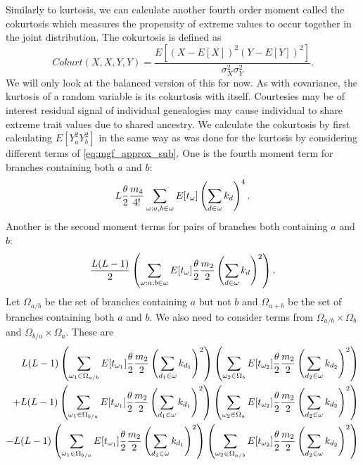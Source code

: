 Similarly to kurtosis, we can calculate another fourth order moment called the
cokurtosis which measures the propensity of extreme values to occur together in
the joint distribution. The cokurtosis is defined as
\begin{equation}
  \label{eq:cokurtosis_def}
  Cokurt(X,X,Y,Y)=\frac{E[(X-E[X])^2(Y-E[Y])^2]}{\sigma_X^2\sigma_Y^2}.
\end{equation}
We will only look at the balanced version of this for now. As with covariance,
the kurtosis of a random variable is its cokurtosis with itself. Courtesies may
be of interest residual signal of individual genealogies may cause individual to
share extreme trait values due to shared ancestry. We calculate the cokurtosis
by first calculating $E[Y_a^2Y_b^2]$ in the same way as was done for the
kurtosis by considering different terms of \eqref{eq:mgf_approx_sub}. One is the
fourth moment term for branches containing both $a$ and $b$:
\begin{equation*}
  L \frac{\theta}{2} \frac{m_4}{4!} \sum_{\omega : a, b \in \omega} E[t_\omega] \left( \sum_{d \in \omega} k_d \right)^4.
\end{equation*}
Another is the second moment terms for pairs of branches both containing $a$ and $b$:
\begin{equation*}
  \frac{L(L-1)}{2} \left( \sum_{\omega : a, b \in \omega}
  E[t_\omega] \frac{\theta}{2} \frac{m_2}{2} \left( \sum_{d \in \omega} k_d \right)^2\right).
\end{equation*}
Let $\Omega_{a/b}$ be the set of branches containing $a$ but not $b$ and
$\Omega_{a+b}$ be the set of branches containing both $a$ and $b$. We also need
to consider terms from $\Omega_{a/b}\times\Omega_{b}$ and
$\Omega_{b/a}\times\Omega_{a}$. These are
\begin{align*}
  L(L-1) \left( \sum_{\omega_1 \in \Omega_{a/b}} E[t_{\omega_1}] \frac{\theta}{2} \frac{m_2}{2}
  \left( \sum_{d_1 \in \omega} k_{d_1} \right)^2 \right)
  \left( \sum_{\omega_2 \in \Omega_{b}} E[t_{\omega_2}] \frac{\theta}{2} \frac{m_2}{2}
  \left( \sum_{d_2 \in \omega} k_{d_2} \right)^2 \right) \\
  + L(L-1) \left( \sum_{\omega_1 \in \Omega_{b/a}} E[t_{\omega_1}] \frac{\theta}{2} \frac{m_2}{2}
  \left( \sum_{d_1 \in \omega} k_{d_1} \right)^2 \right)
  \left( \sum_{\omega_2 \in \Omega_{a}} E[t_{\omega_2}] \frac{\theta}{2} \frac{m_2}{2}
  \left( \sum_{d_2 \in \omega} k_{d_2} \right)^2 \right) \\
  - L(L-1) \left( \sum_{\omega_1 \in \Omega_{b/a}} E[t_{\omega_1}] \frac{\theta}{2} \frac{m_2}{2}
  \left( \sum_{d_1 \in \omega} k_{d_1} \right)^2 \right)
  \left( \sum_{\omega_2 \in \Omega_{a/b}} E[t_{\omega_2}] \frac{\theta}{2} \frac{m_2}{2}
  \left( \sum_{d_2 \in \omega} k_{d_2} \right)^2\right)
\end{align*}
